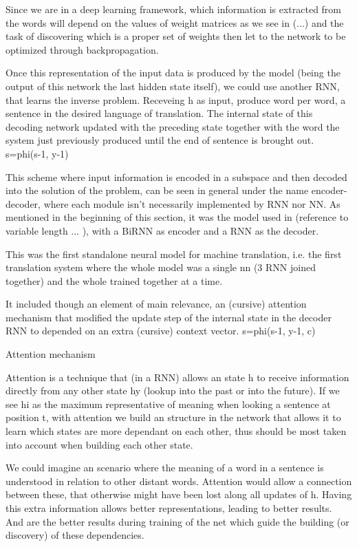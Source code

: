 \documentclass[11pt,english,listoffigures,listoftables]{tfgetsinf}
\begin{document}
Since we are in a deep learning framework, which information is extracted from the words will depend on the values of weight matrices as we see in (...) and the task of discovering which is a proper set of weights then let to the network to be optimized through backpropagation.  

Once this representation of the input data is produced by the model (being the output of this network the last hidden state itself), we could use another RNN, that learns the inverse problem. Receveing h as input, produce word per word, a sentence in the desired language of translation. The internal state of this decoding network updated with the preceding state together with the word the system just previously produced until the end of sentence is brought out.
s=phi(s-1, y-1)

This scheme where input information is encoded in a subspace and then decoded into the solution of the problem, can be seen in general under the name encoder-decoder, where each module isn't necessarily implemented by RNN nor NN.
As mentioned in the beginning of this section, it was the model used in (reference to variable length ... ), with a BiRNN as encoder and a RNN as the decoder.

This was the first standalone neural model for machine translation, i.e. the first translation system where the whole model was a single nn (3 RNN joined together) and the whole trained together at a time. 

It included though an element of main relevance, an (cursive) attention mechanism that modified the update step of the internal state in the decoder RNN to depended on an extra (cursive) context vector.
s=phi(s-1, y-1, c)

Attention mechanism

Attention is a technique that (in a RNN) allows an state h to receive information directly from any other state hy (lookup into the past or into the future). If we see hi as the maximum representative of meaning when looking a sentence at position t, with attention we build an structure in the network that allows it to learn which states are more dependant on each other, thus should be most taken into account when building each other state. 

We could imagine an scenario where the meaning of a word in a sentence is understood in relation to other distant words. Attention would allow a connection between these, that otherwise might have been lost along all updates of h. Having this extra information allows better representations, leading to better results. And are the better results during training of the net which guide the building (or discovery) of these dependencies.
\end{document}
